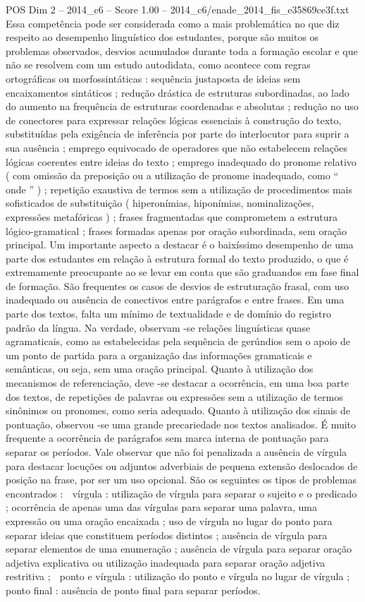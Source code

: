 \begin{textsample}{POS Dim 2 – 2014\_c6 – Score 1.00 – 2014\_c6/enade\_2014\_fis\_e35869ce3f.txt}
Essa competência pode ser considerada como a mais problemática no que diz respeito ao desempenho linguístico dos estudantes, porque são muitos os problemas observados, desvios acumulados durante toda a formação escolar e que não se resolvem com um estudo autodidata, como acontece com regras ortográficas ou morfossintáticas : sequência justaposta de ideias sem encaixamentos sintáticos ; redução drástica de estruturas subordinadas, ao lado do aumento na frequência de estruturas coordenadas e absolutas ; redução no uso de conectores para expressar relações lógicas essenciais à construção do texto, substituídas pela exigência de inferência por parte do interlocutor para suprir a sua ausência ; emprego equivocado de operadores que não estabelecem relações lógicas coerentes entre ideias do texto ; emprego inadequado do pronome relativo ( com omissão da preposição ou a utilização de pronome inadequado, como “ onde ” ) ; repetição exaustiva de termos sem a utilização de procedimentos mais sofisticados de substituição ( hiperonímias, hiponímias, nominalizações, expressões metafóricas ) ; frases fragmentadas que comprometem a estrutura lógico-gramatical ; frases formadas apenas por oração subordinada, sem oração principal.
Um importante aspecto a destacar é o baixíssimo desempenho de uma parte dos estudantes em relação à estrutura formal do texto produzido, o que é extremamente preocupante ao se levar em conta que são graduandos em fase final de formação.
São frequentes os casos de desvios de estruturação frasal, com uso inadequado ou ausência de conectivos entre parágrafos e entre frases.
Em uma parte dos textos, falta um mínimo de textualidade e de domínio do registro padrão da língua.
Na verdade, observam -se relações linguísticas quase agramaticais, como as estabelecidas pela sequência de gerúndios sem o apoio de um ponto de partida para a organização das informações gramaticais e semânticas, ou seja, sem uma oração principal.
Quanto à utilização dos mecanismos de referenciação, deve -se destacar a ocorrência, em uma boa parte dos textos, de repetições de palavras ou expressões sem a utilização de termos sinônimos ou pronomes, como seria adequado.
Quanto à utilização dos sinais de pontuação, observou -se uma grande precariedade nos textos analisados.
É muito frequente a ocorrência de parágrafos sem marca interna de pontuação para separar os períodos.
Vale observar que não foi penalizada a ausência de vírgula para destacar locuções ou adjuntos adverbiais de pequena extensão deslocados de posição na frase, por ser um uso opcional.
São os seguintes os tipos de problemas encontrados :  vírgula : utilização de vírgula para separar o sujeito e o predicado ; ocorrência de apenas uma das vírgulas para separar uma palavra, uma expressão ou uma oração encaixada ; uso de vírgula no lugar do ponto para separar ideias que constituem períodos distintos ; ausência de vírgula para separar elementos de uma enumeração ; ausência de vírgula para separar oração adjetiva explicativa ou utilização inadequada para separar oração adjetiva restritiva ;  ponto e vírgula : utilização do ponto e vírgula no lugar de vírgula ;  ponto final : ausência de ponto final para separar períodos.

\end{textsample}
